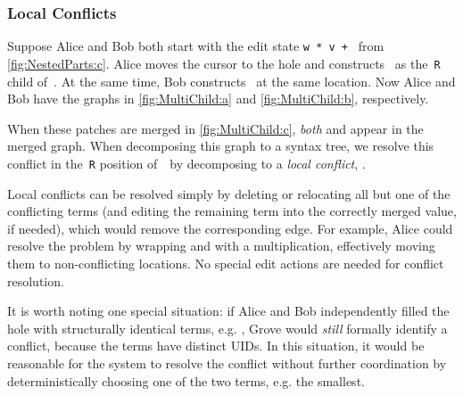 \subsubsection{Local Conflicts}%
\label{sub:Multi-child conflicts}

\figureMultiChild

Suppose Alice and Bob both start with the edit state \texttt{w * v + \hole} from \autoref{fig:NestedParts:c}.
Alice moves the cursor to the hole and constructs~\vMultiChildAlice{} as the~\texttt{R} child of~\vWrapPlus{}.
At the same time, Bob constructs~\vMultiChildBob{} at the same location.
Now Alice and Bob have the graphs in \autoref{fig:MultiChild:a} and \autoref{fig:MultiChild:b}, respectively.

When these patches are merged in \autoref{fig:MultiChild:c}, \emph{both} \eMultiChildAlice{} and \eMultiChildBob{}
appear in the merged graph. 
When decomposing this graph to a syntax tree, 
we resolve this conflict in the~\texttt{R} position of~\vWrapPlus~by decomposing to a \emph{local conflict}, {}.


Local conflicts can be resolved simply by deleting or relocating all but one of the conflicting terms (and editing the remaining term into the correctly merged value, if needed), which would remove the corresponding edge.
For example, Alice could resolve the problem by wrapping  and  with a multiplication, effectively moving them to non-conflicting locations.
No special edit actions are needed for conflict resolution.


It is worth noting one special situation: if Alice and Bob independently filled the hole with structurally identical terms, e.g. , Grove would \emph{still} formally identify a conflict, because the terms have distinct UIDs. In this situation, it would be reasonable for the system to resolve the conflict without further coordination by deterministically choosing one of the two terms, e.g. the smallest.

